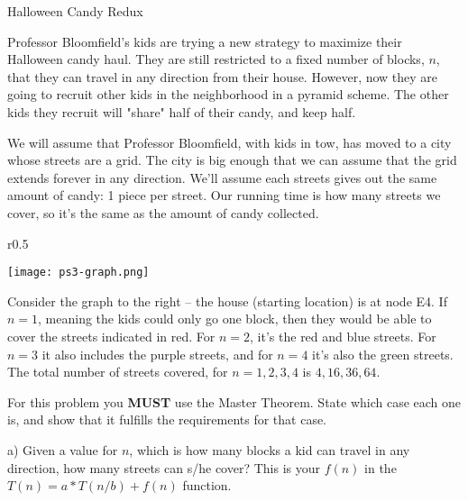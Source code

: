 \documentclass[10pt]{article}
\begin{document}
\thispagestyle{empty}
\handout

\begin{problem} Halloween Candy Redux \end{problem}

Professor Bloomfield's kids are trying a new strategy to maximize their Halloween candy haul.  They are still restricted to a fixed number of blocks, $n$, that they can travel in any direction from their house.  However, now they are going to recruit other kids in the neighborhood in a pyramid scheme.  The other kids they recruit will "share" half of their candy, and keep half.

We will assume that Professor Bloomfield, with kids in tow, has moved to a city whose streets are a grid.  The city is big enough that we can assume that the grid extends forever in any direction.  We'll assume each streets gives out the same amount of candy: 1 piece per street.  Our running time is how many streets we cover, so it's the same as the amount of candy collected.

\begin{wrapfigure}{r}{0.5\textwidth}
\begin{center}
\texttt{[image: ps3-graph.png]}
\end{center}
\end{wrapfigure}

Consider the graph to the right -- the house (starting location) is at node E4.  If $n=1$, meaning the kids could only go one block, then they would be able to cover the streets indicated in red.  For $n=2$, it's the red and blue streets.  For $n=3$ it also includes the purple streets, and for $n=4$ it's also the green streets.  The total number of streets covered, for $n=1,2,3,4$ is $4,16,36,64$.

For this problem you {\bf MUST} use the Master Theorem.  State which case each one is, and show that it fulfills the requirements for that case.

\vspace{0.25in}

\noindent a) Given a value for $n$, which is how many blocks a kid can travel in any direction, how many streets can s/he cover?  This is your $f(n)$ in the $T(n)=a \ast T(n/b) + f(n)$ function.

\solution{

}


\vspace{0.25in}
\end{document}
